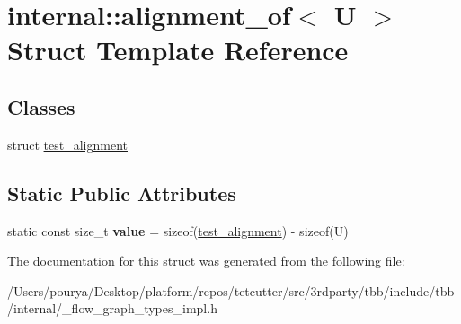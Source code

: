 \hypertarget{structinternal_1_1alignment__of}{}\section{internal\+:\+:alignment\+\_\+of$<$ U $>$ Struct Template Reference}
\label{structinternal_1_1alignment__of}
\subsection*{Classes}
\begin{DoxyCompactItemize}
\item 
struct \hyperlink{structinternal_1_1alignment__of_1_1test__alignment}{test\+\_\+alignment}
\end{DoxyCompactItemize}
\subsection*{Static Public Attributes}
\begin{DoxyCompactItemize}
\item 
\hypertarget{structinternal_1_1alignment__of_aeb3477afec0f511c749f515e73876f06}{}static const size\+\_\+t {\bfseries value} = sizeof(\hyperlink{structinternal_1_1alignment__of_1_1test__alignment}{test\+\_\+alignment}) -\/ sizeof(U)\label{structinternal_1_1alignment__of_aeb3477afec0f511c749f515e73876f06}

\end{DoxyCompactItemize}


The documentation for this struct was generated from the following file\+:\begin{DoxyCompactItemize}
\item 
/\+Users/pourya/\+Desktop/platform/repos/tetcutter/src/3rdparty/tbb/include/tbb/internal/\+\_\+flow\+\_\+graph\+\_\+types\+\_\+impl.\+h\end{DoxyCompactItemize}
